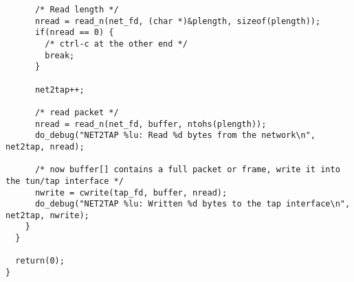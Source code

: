 \documentclass[a4paper,12pt]{article}
\begin{document}
\begin{verbatim}
      /* Read length */      
      nread = read_n(net_fd, (char *)&plength, sizeof(plength));
      if(nread == 0) {
        /* ctrl-c at the other end */
        break;
      }

      net2tap++;

      /* read packet */
      nread = read_n(net_fd, buffer, ntohs(plength));
      do_debug("NET2TAP %lu: Read %d bytes from the network\n", net2tap, nread);

      /* now buffer[] contains a full packet or frame, write it into the tun/tap interface */ 
      nwrite = cwrite(tap_fd, buffer, nread);
      do_debug("NET2TAP %lu: Written %d bytes to the tap interface\n", net2tap, nwrite);
    }
  }
  
  return(0);
}
	\end{verbatim}
	\restoregeometry
\end{document}
